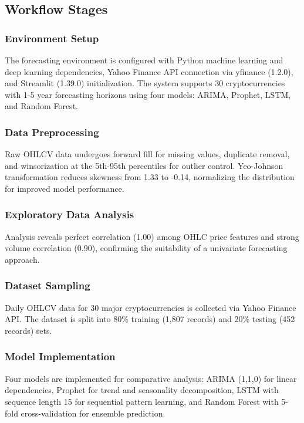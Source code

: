 \documentclass[conference]{IEEEtran}
\begin{document}
\subsection{Workflow Stages}

\subsubsection{Environment Setup}
The forecasting environment is configured with Python machine learning and deep learning dependencies, Yahoo Finance API connection via yfinance (1.2.0), and Streamlit (1.39.0) initialization. The system supports 30 cryptocurrencies with 1-5 year forecasting horizons using four models: ARIMA, Prophet, LSTM, and Random Forest.

\subsubsection{Data Preprocessing}
Raw OHLCV data undergoes forward fill for missing values, duplicate removal, and winsorization at the 5th-95th percentiles for outlier control. Yeo-Johnson transformation reduces skewness from 1.33 to -0.14, normalizing the distribution for improved model performance.

\subsubsection{Exploratory Data Analysis}
Analysis reveals perfect correlation (1.00) among OHLC price features and strong volume correlation (0.90), confirming the suitability of a univariate forecasting approach.

\subsubsection{Dataset Sampling}
Daily OHLCV data for 30 major cryptocurrencies is collected via Yahoo Finance API. The dataset is split into 80\% training (1,807 records) and 20\% testing (452 records) sets.

\subsubsection{Model Implementation}
Four models are implemented for comparative analysis: ARIMA (1,1,0) for linear dependencies, Prophet for trend and seasonality decomposition, LSTM with sequence length 15 for sequential pattern learning, and Random Forest with 5-fold cross-validation for ensemble prediction.
\end{document}
